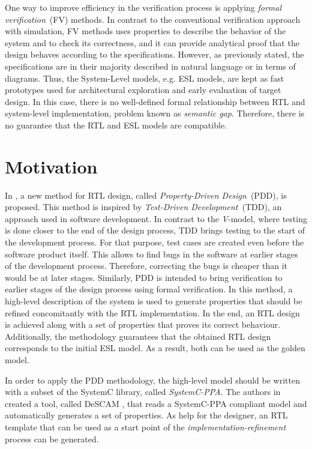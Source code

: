 One way to improve efficiency in the verification process is applying \textit{formal verification}~(FV) methods. In contrast to the conventional verification approach with simulation, FV methods uses properties to describe the behavior of the system and to check its correctness, and it can provide analytical proof that the design behaves according to the specifications. However, as previously stated, the specifications are in their majority described in natural language or in terms of diagrams. Thus, the System-Level models, e.g. ESL models, are kept as fast prototypes used for architectural exploration and early evaluation of target design. In this case, there is no well-defined formal relationship between RTL and system-level implementation, problem known as \textit{semantic gap}. Therefore, there is no guarantee that the RTL and ESL models are compatible.

\section*{Motivation}

In \cite{paper-pdd}, a new method for RTL design, called \textit{Property-Driven Design}~(PDD), is proposed. This method is inspired by \textit{Test-Driven Development}~(TDD), an approach used in software development. In contrast to the \textit{V}-model, where testing is done closer to the end of the design process, TDD brings testing to the start of the development process. For that purpose, test cases are created even before the software product itself. This allows to find bugs in the software at earlier stages of the development process. Therefore, correcting the bugs is cheaper than it would be at later stages. Similarly, PDD is intended to bring verification to earlier stages of the design process using formal verification. In this method, a high-level description of the system is used to generate properties that should be refined concomitantly with the RTL implementation. In the end, an RTL design is achieved along with a set of properties that proves its correct behaviour. Additionally, the methodology guarantees that the obtained RTL design corresponds to the initial ESL model. As a result, both can be used as the golden model.

In order to apply the PDD methodology, the high-level model should be written with a subset of the SystemC \cite{lib-systemc} library, called \textit{SystemC-PPA}. The authors in \cite{paper-pdd} created a tool, called DeSCAM \cite{descam}, that reads a SystemC-PPA compliant model and automatically generates a set of properties. As help for the designer, an RTL template that can be used as a start point of the \textit{implementation-refinement} process can be generated.

